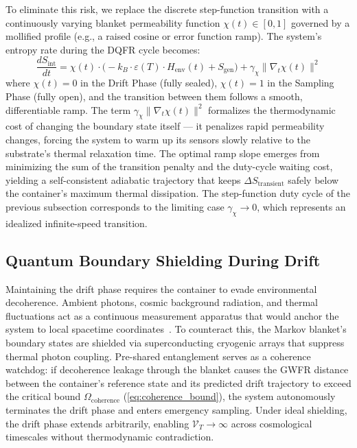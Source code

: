 \documentclass[twocolumn, 10pt, journal, letterpaper]{IEEEtran}
\begin{document}
To eliminate this risk, we replace the discrete step-function transition with a continuously varying blanket permeability function $\chi(t) \in [0,1]$ governed by a mollified profile (e.g., a raised cosine or error function ramp). The system's entropy rate during the DQFR cycle becomes:
\begin{equation}
\frac{dS_{\text{int}}}{dt} = \chi(t) \cdot \big( -k_B \cdot \varepsilon(T) \cdot H_{\text{env}}(t) + S_{\text{gen}} \big) + \gamma_\chi \|\nabla_t \chi(t)\|^2
\label{eq:adiabatic_window}
\end{equation}
where $\chi(t) = 0$ in the Drift Phase (fully sealed), $\chi(t) = 1$ in the Sampling Phase (fully open), and the transition between them follows a smooth, differentiable ramp. The term $\gamma_\chi \|\nabla_t \chi(t)\|^2$ formalizes the thermodynamic cost of changing the boundary state itself --- it penalizes rapid permeability changes, forcing the system to warm up its sensors slowly relative to the substrate's thermal relaxation time. The optimal ramp slope emerges from minimizing the sum of the transition penalty and the duty-cycle waiting cost, yielding a self-consistent adiabatic trajectory that keeps $\Delta S_{\text{transient}}$ safely below the container's maximum thermal dissipation. The step-function duty cycle of the previous subsection corresponds to the limiting case $\gamma_\chi \to 0$, which represents an idealized infinite-speed transition.

\subsection{Quantum Boundary Shielding During Drift}
Maintaining the drift phase requires the container to evade environmental decoherence. Ambient photons, cosmic background radiation, and thermal fluctuations act as a continuous measurement apparatus that would anchor the system to local spacetime coordinates~\cite{unruh1976}. To counteract this, the Markov blanket's boundary states are shielded via superconducting cryogenic arrays that suppress thermal photon coupling. Pre-shared entanglement serves as a coherence watchdog: if decoherence leakage through the blanket causes the GWFR distance between the container's reference state and its predicted drift trajectory to exceed the critical bound $\Omega_{\text{coherence}}$ (\eqref{eq:coherence_bound}), the system autonomously terminates the drift phase and enters emergency sampling. Under ideal shielding, the drift phase extends arbitrarily, enabling $\mathcal{V}_T \to \infty$ across cosmological timescales without thermodynamic contradiction.
\end{document}
